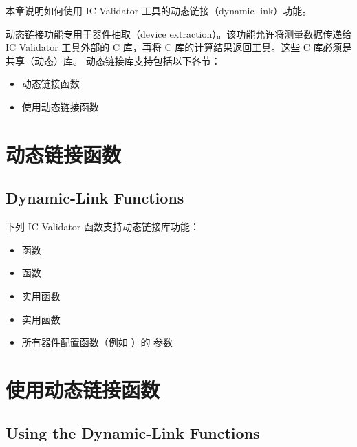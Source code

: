 \label{chap:dll}

本章说明如何使用 IC Validator 工具的动态链接（dynamic-link）功能。

动态链接功能专用于器件抽取（device extraction）。该功能允许将测量数据传递给 IC Validator 工具外部的 C 库，再将 C 库的计算结果返回工具。这些 C 库必须是共享（动态）库。
动态链接库支持包括以下各节：
\begin{itemize}
  \item 动态链接函数
  \item 使用动态链接函数
\end{itemize}

\section{动态链接函数}
\subsection*{Dynamic-Link Functions}

下列 IC Validator 函数支持动态链接库功能：
\begin{itemize}
  \item {} 函数
  \item {} 函数
  \item {} 实用函数
  \item {} 实用函数
  \item 所有器件配置函数（例如 ）的  参数
\end{itemize}

\section{使用动态链接函数}
\subsection*{Using the Dynamic-Link Functions}

